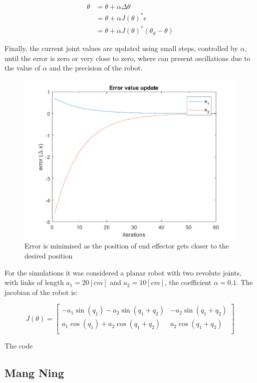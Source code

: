\documentclass{article}
\begin{document}
\begin{equation}
\begin{aligned}
\theta & = \theta + \alpha\Delta\theta \\
& = \theta + \alpha J(\theta)^{*}e \\
&=  \theta + \alpha J(\theta)^{*}(\theta_d - \theta)
\end{aligned}
\end{equation}

Finally, the current joint values are updated using small steps, controlled by $\alpha$, until the error is zero or very close to zero, where can present oscillations  due to the value of $\alpha$ and the precision of the robot.

\begin{figure}[htbp] 
\begin{center}
\includegraphics[width=\textwidth]{images/error_p3_rodrigo}
\caption{Error is minimised as the position of end effector gets closer to the desired position}
\label{fig:part3.joint_trajectory}
\end{center}
\end{figure}

For the simulations it was considered a planar robot with two revolute joints, with links of length $a_1=20 [cm]$ and $a_2=10 [cm]$, the coefficient $\alpha = 0.1$. The jacobian of the robot is:

\begin{equation}
J(\theta) = \left[ \begin{array}{cc}
	-a_1\sin(q_1) - a_2\sin(q_1+q_2) & -a_2\sin(q_1+q_2) \\
        a_1\cos(q_1)+a_2\cos(q_1+q_2) & a_2\cos(q_1+q_2) \\
\end{array} \right] 
\end{equation}

The code

\subsection{Mang Ning}
\end{document}
